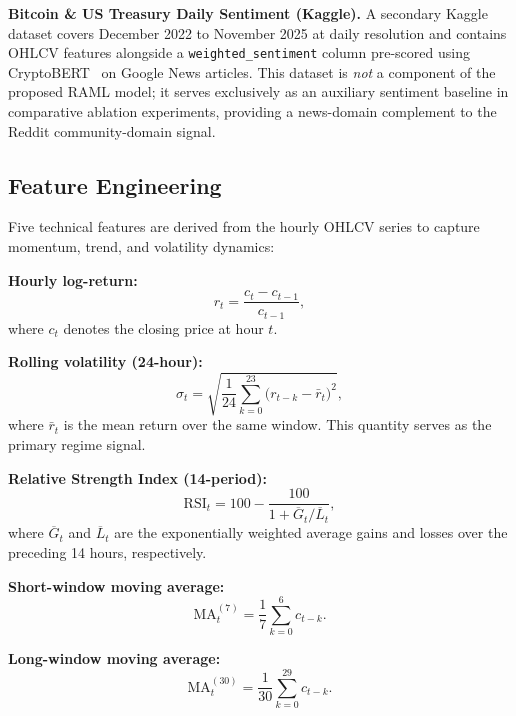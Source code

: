 \documentclass[journal]{IEEEtran}
\newcommand{\raml}{\textsc{RAML}}
\begin{document}
\textbf{Bitcoin \& US Treasury Daily Sentiment (Kaggle).}
A secondary Kaggle dataset covers December 2022 to November 2025 at daily
resolution and contains OHLCV features alongside a \texttt{weighted\_sentiment}
column pre-scored using CryptoBERT~\cite{huang2023cryptobert} on Google News
articles. This dataset is \textit{not} a component of the proposed \raml{}
model; it serves exclusively as an auxiliary sentiment baseline in comparative
ablation experiments, providing a news-domain complement to the Reddit
community-domain signal.

\subsection{Feature Engineering}
\label{ssec:features}
Five technical features are derived from the hourly OHLCV series to capture
momentum, trend, and volatility dynamics:

\textbf{Hourly log-return:}
\begin{equation}
  r_t = \frac{c_t - c_{t-1}}{c_{t-1}},
  \label{eq:returns}
\end{equation}
where $c_t$ denotes the closing price at hour $t$.

\textbf{Rolling volatility (24-hour):}
\begin{equation}
  \sigma_t = \sqrt{\frac{1}{24}\sum_{k=0}^{23}\bigl(r_{t-k} - \bar{r}_t\bigr)^2},
  \label{eq:vol}
\end{equation}
where $\bar{r}_t$ is the mean return over the same window. This quantity serves
as the primary regime signal.

\textbf{Relative Strength Index (14-period):}
\begin{equation}
  \mathrm{RSI}_t = 100 - \frac{100}{1 + \overline{G}_t / \overline{L}_t},
  \label{eq:rsi}
\end{equation}
where $\overline{G}_t$ and $\overline{L}_t$ are the exponentially weighted
average gains and losses over the preceding 14 hours, respectively.

\textbf{Short-window moving average:}
\begin{equation}
  \mathrm{MA}^{(7)}_t = \frac{1}{7}\sum_{k=0}^{6} c_{t-k}.
  \label{eq:ma7}
\end{equation}

\textbf{Long-window moving average:}
\begin{equation}
  \mathrm{MA}^{(30)}_t = \frac{1}{30}\sum_{k=0}^{29} c_{t-k}.
  \label{eq:ma30}
\end{equation}
\end{document}
